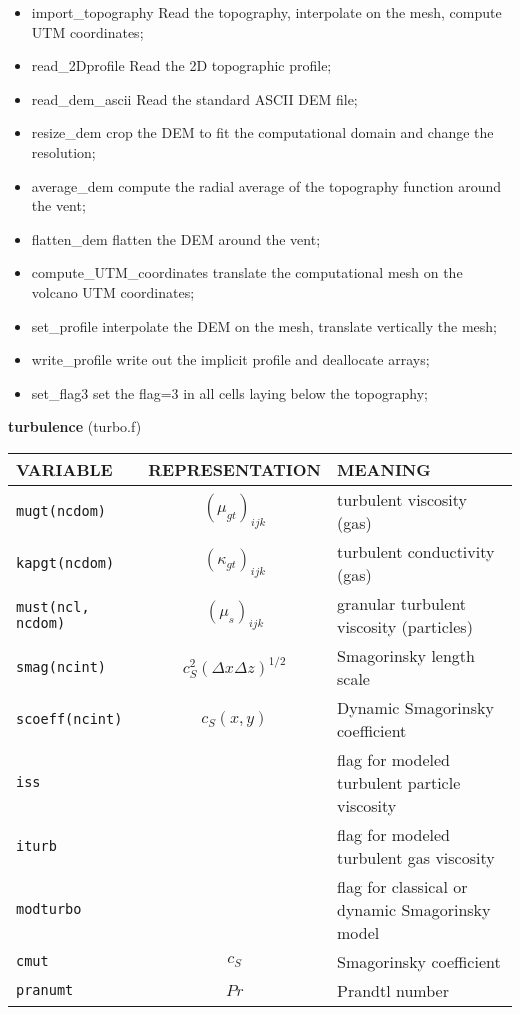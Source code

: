 \begin{itemize}
\item{import\_topography} Read the topography, interpolate on the mesh, compute UTM coordinates;
\item{read\_2Dprofile} Read the 2D topographic profile;
\item{read\_dem\_ascii} Read the standard ASCII DEM file;
\item{resize\_dem} crop the DEM to fit the computational domain and change the resolution;
\item{average\_dem} compute the radial average of the topography function around the vent;
\item{flatten\_dem} flatten the DEM around the vent;
\item{compute\_UTM\_coordinates} translate the computational mesh on the volcano UTM coordinates;
\item{set\_profile} interpolate the DEM on the mesh, translate vertically the mesh;
\item{write\_profile} write out the implicit profile and deallocate arrays;
\item{set\_flag3} set the flag=3 in all cells laying below the topography;
\end{itemize}
%
%
{\large{\bf turbulence}} (turbo.f)\\[5mm]
\begin{tabular}{|p{6cm}|c|p{6cm}|}\hline
VARIABLE & REPRESENTATION & MEANING\\\hline
\tt mugt(ncdom) & $(\mu_{gt})_{ijk}$ &  turbulent viscosity (gas)\\\hline
\tt kapgt(ncdom) & $(\kappa_{gt})_{ijk}$ &  turbulent conductivity (gas)\\\hline
\tt must(ncl, ncdom) & $(\mu_s)_{ijk}$ &   granular turbulent viscosity (particles)\\\hline
\tt smag(ncint) & $c_S^2(\Delta x\Delta z)^{1/2}$ &  Smagorinsky length scale \\\hline
\tt scoeff(ncint) & $c_S(x,y)$ &  Dynamic Smagorinsky coefficient \\\hline
\tt iss & $ $ & flag for modeled turbulent particle viscosity \\\hline
\tt iturb & $ $ & flag for modeled turbulent gas viscosity \\\hline
\tt modturbo & $ $ & flag for classical or dynamic Smagorinsky model\\\hline
\tt cmut & $ c_S $ &Smagorinsky coefficient \\\hline
\tt pranumt & $ Pr $ & Prandtl number\\\hline
\end{tabular}\\
